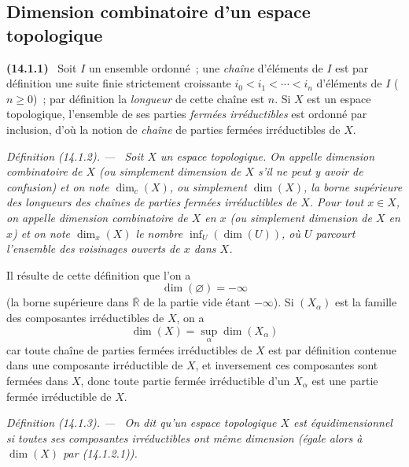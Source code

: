 \documentclass[10pt,oneside]{book}
\makeatletter
\newcommand{\setmanualcurrentlabel}[1]{\def\@currentlabel{#1}}
\newcommand{\oldpage}[2][]{%
  \setcounter{footnote}{0}%
  \marginpar{\scriptsize\textbf{#1}~|~#2}\ignorespaces}
\newenvironment{env}[1][]{\setmanualcurrentlabel{#1}\par\medskip\noindent\textbf{(#1)}\ }{\par}
\newenvironment{definition}[1][]{%
  \setmanualcurrentlabel{#1}\par\medskip\noindent\itshape Définition (#1). ---\ }{\par}
\makeatother
\begin{document}
\setcounter{subsection}{0}
\subsection{Dimension combinatoire d'un espace topologique}
\label{subsection:0.14.1-fr}

\oldpage[0\textsubscript{IV-1}]{6}
\begin{env}[14.1.1]
\label{0.14.1.1-fr}
Soit $I$ un ensemble ordonné~; une \emph{chaîne} d'éléments de $I$ est par
définition une suite finie strictement croissante
$i_0<i_1<\cdots<i_n$ d'éléments de $I$ ($n\geq 0$)~; par définition la
\emph{longueur} de cette chaîne est $n$. Si $X$ est un espace topologique,
l'ensemble de ses parties \emph{fermées irréductibles} est ordonné par
inclusion, d'où la notion de \emph{chaîne} de parties fermées irréductibles de
$X$.
\end{env}

\begin{definition}[14.1.2]
\label{0.14.1.2-fr}
Soit $X$ un espace topologique. On appelle \emph{dimension combinatoire de
$X$} (ou simplement \emph{dimension de $X$} s'il ne peut y avoir de
confusion) et on note $\dim_c(X)$, ou simplement $\dim(X)$, la borne
supérieure des longueurs des chaînes de parties fermées irréductibles de $X$.
Pour tout $x\in X$, on appelle \emph{dimension combinatoire de $X$ en $x$}
(ou simplement \emph{dimension de $X$ en $x$}) et on note $\dim_x(X)$ le
nombre $\inf_U(\dim(U))$, où $U$ parcourt l'ensemble des voisinages ouverts de
$x$ dans $X$.
\end{definition}

Il résulte de cette définition que l'on a
\[
  \dim(\varnothing)=-\infty
\]
(la borne supérieure dans $\overline{\mathbb R}$ de la partie vide étant
$-\infty$). Si $(X_\alpha)$ est la famille des composantes irréductibles de
$X$, on a
\[
  \dim(X)=\sup_\alpha\dim(X_\alpha)
  \tag{14.1.2.1}\label{0.14.1.2.1-fr}
\]
car toute chaîne de parties fermées irréductibles de $X$ est par définition
contenue dans une composante irréductible de $X$, et inversement ces
composantes sont fermées dans $X$, donc toute partie fermée irréductible d'un
$X_\alpha$ est une partie fermée irréductible de $X$.

\begin{definition}[14.1.3]
\label{0.14.1.3-fr}
On dit qu'un espace topologique $X$ est \emph{équidimensionnel} si toutes ses
composantes irréductibles ont même dimension (égale alors à $\dim(X)$ par
(14.1.2.1)).
\end{definition}
\end{document}
